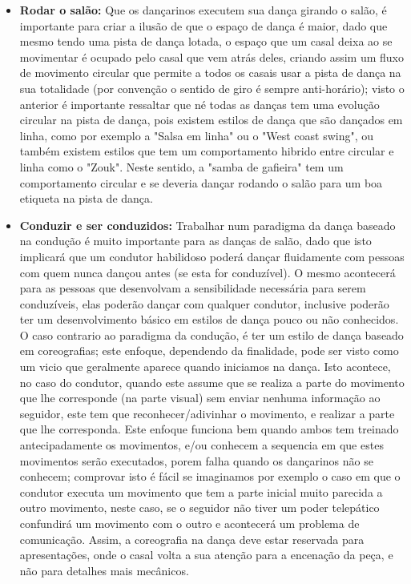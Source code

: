 \begin{itemize}
\item \textbf{Rodar o salão:} Que os dançarinos executem sua dança girando o salão, 
é importante para criar a ilusão de que o espaço de dança é maior, dado que mesmo
tendo uma pista de dança lotada, o espaço que um
casal deixa ao se movimentar é ocupado pelo casal que vem atrás deles, criando 
assim um fluxo de movimento circular que permite a todos os casais usar a pista de dança
na sua totalidade (por convenção o sentido de giro é sempre anti-horário); 
visto o anterior é importante ressaltar que né todas as danças tem
uma evolução circular na pista de dança, pois existem estilos de dança que são dançados em linha,
como por exemplo a "Salsa em linha" ou o "West coast swing", ou também existem estilos que
tem um comportamento hibrido entre circular e linha como o "Zouk". Neste sentido,
a "samba de gafieira"  tem um comportamento circular e se deveria dançar
rodando o salão para um boa etiqueta na pista de dança.
\item \textbf{Conduzir e ser conduzidos:} Trabalhar num paradigma da dança baseado
na condução é muito importante para as danças de salão, dado que isto implicará
que um condutor habilidoso poderá dançar fluidamente com pessoas com quem nunca dançou
antes (se esta for conduzível). O mesmo acontecerá para as pessoas que desenvolvam
a sensibilidade necessária para serem conduzíveis, elas poderão dançar com qualquer
condutor, inclusive poderão ter um desenvolvimento básico em estilos de dança pouco ou não conhecidos.
O caso contrario ao paradigma da condução, é ter um estilo de dança baseado em coreografias;
este enfoque, dependendo da finalidade, pode ser visto como um vicio que geralmente aparece quando iniciamos
na dança. Isto acontece, no caso do condutor, quando este assume que se realiza a parte do movimento 
que lhe corresponde (na parte visual) sem enviar nenhuma informação ao seguidor, 
este tem que reconhecer/adivinhar o movimento, e realizar a parte que lhe corresponda. Este enfoque
funciona bem quando ambos tem treinado antecipadamente os movimentos, e/ou conhecem a sequencia
em que estes movimentos serão executados, porem falha quando os dançarinos não se conhecem;
comprovar isto é fácil se imaginamos por exemplo o caso em que o condutor executa um movimento
que tem a parte inicial muito parecida a outro movimento, neste caso, se o seguidor não tiver
um poder telepático confundirá um movimento com o outro e acontecerá um problema de comunicação. Assim, a coreografia
na dança deve estar reservada para apresentações, onde o casal volta 
a sua atenção para a encenação da peça, e não para detalhes mais mecânicos.


\end{itemize}
